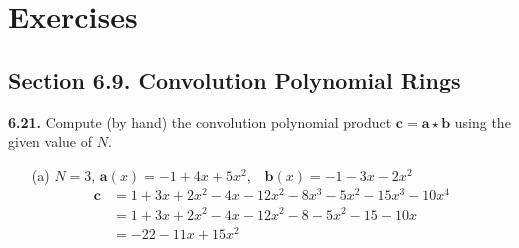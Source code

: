 \documentclass[11pt,fleqn]{article}
\begin{document}
\section*{Exercises}

\subsection*{Section 6.9. Convolution Polynomial Rings}

\textbf{6.21.} Compute (by hand) the convolution polynomial product $\mathbf{c} = \mathbf{a} \star \mathbf{b}$ using the given value of $N$.
\begin{itemize}
\item[(a)] $N = 3$, \;\;\;$\mathbf{a}(x) = -1 + 4x + 5x^2, \;\;\; \mathbf{b}(x) = -1-3x-2x^2$ 
\begin{align}
    \mathbf{c} &= 1 + 3x + 2x^2 - 4x - 12x^2 - 8x^3 - 5x^2 - 15x^3 - 10x^4\nonumber\\
    &= 1 + 3x + 2x^2 - 4x - 12x^2 - 8 - 5x^2 - 15 - 10x\nonumber\\
    &= -22 - 11x + 15x^2\nonumber
\end{align}

\end{itemize}
\end{document}
